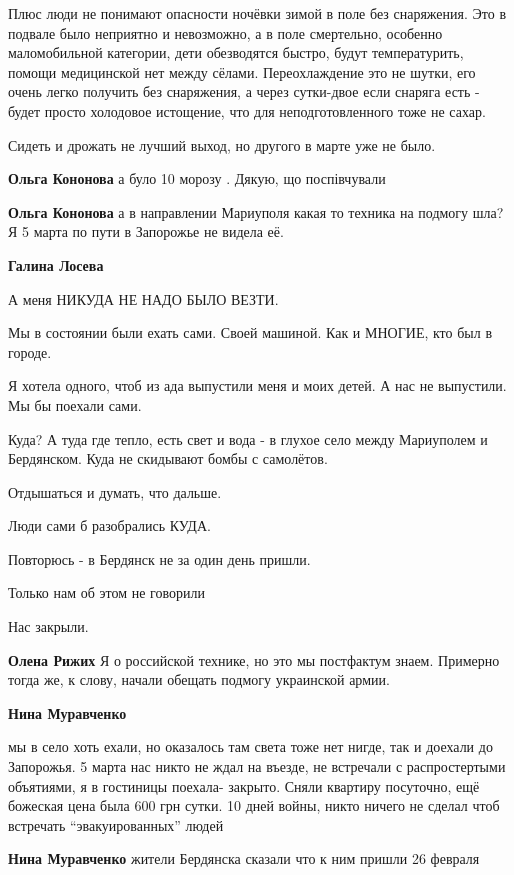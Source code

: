 \begin{itemize}
Плюс люди не понимают опасности ночёвки зимой в поле без снаряжения. Это в
подвале было неприятно и невозможно, а в поле смертельно, особенно
маломобильной категории, дети обезводятся быстро, будут температурить, помощи
медицинской нет между сёлами. Переохлаждение это не шутки, его очень легко
получить без снаряжения, а через сутки-двое если снаряга есть - будет просто
холодовое истощение, что для неподготовленного тоже не сахар.

Сидеть и дрожать не лучший выход, но другого в марте уже не было.

\textbf{Ольга Кононова} а було 10 морозу . Дякую, що поспівчували

\textbf{Ольга Кононова} а в направлении Мариуполя какая то техника на подмогу шла? Я 5 марта по пути в Запорожье не видела её.

\textbf{Галина Лосева} 

А меня НИКУДА НЕ НАДО БЫЛО ВЕЗТИ.

Мы в состоянии были ехать сами. Своей машиной. Как и МНОГИЕ, кто был в городе.

Я хотела одного, чтоб из ада выпустили меня и моих детей. А нас не выпустили.
Мы бы поехали сами.

Куда? А туда где тепло, есть свет и вода - в глухое село между Мариуполем и
Бердянском. Куда не скидывают бомбы с самолётов.

Отдышаться и думать, что дальше.

Люди сами б разобрались КУДА.

Повторюсь - в Бердянск не за один день пришли.

Только нам об этом не говорили

Нас закрыли.

\textbf{Олена Рижих} Я о российской технике, но это мы постфактум знаем. Примерно тогда же, к слову, начали обещать подмогу украинской армии.

\textbf{Нина Муравченко} 

мы в село хоть ехали, но оказалось там света тоже нет нигде, так и доехали до
Запорожья. 5 марта нас никто не ждал на въезде, не встречали с распростертыми
объятиями, я в гостиницы поехала- закрыто. Сняли квартиру посуточно, ещё
божеская цена была 600 грн сутки. 10 дней войны, никто ничего не сделал чтоб
встречать \enquote{эвакуированных} людей

\textbf{Нина Муравченко} жители Бердянска сказали что к ним пришли 26 февраля


\end{itemize}
